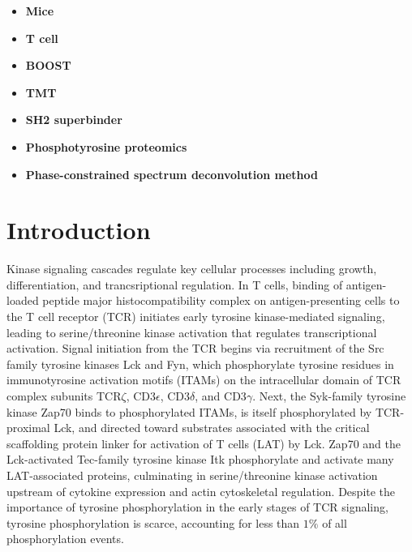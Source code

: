 \documentclass[journal=jprobs,manuscript=article]{achemso}
\begin{document}
\begin{itemize}
    \item {\textbf{Mice}}
    \item {\textbf{T cell}}
    \item {\textbf{BOOST} }
    \item {\textbf{TMT} }
    \item {\textbf{SH2 superbinder}}
    \item {\textbf{Phosphotyrosine proteomics} }
    \item {\textbf{Phase-constrained spectrum deconvolution method}}
\end{itemize}

\section{Introduction}


Kinase signaling cascades regulate key cellular processes including growth, differentiation, and trancsriptional regulation. In T cells, binding of antigen-loaded peptide major histocompatibility complex on antigen-presenting cells to the T cell  receptor (TCR) initiates early tyrosine kinase-mediated signaling, leading to serine/threonine kinase activation that regulates transcriptional activation\cite{gaud2018regulatory}. Signal initiation from the TCR begins via recruitment of the Src family tyrosine kinases Lck and Fyn, which phosphorylate tyrosine residues in immunotyrosine activation motifs (ITAMs) on the intracellular domain of TCR complex subunits TCR$\zeta$, CD3$\epsilon$, CD3$\delta$, and CD3$\gamma$\cite{palacios2004function,gaud2018regulatory}. Next, the Syk-family tyrosine kinase Zap70 binds to phosphorylated ITAMs, is itself phosphorylated by TCR-proximal Lck, and directed toward substrates associated with the critical scaffolding protein linker for activation of T cells (LAT) by Lck\cite{lo2018lck}. Zap70 and the Lck-activated Tec-family tyrosine kinase Itk phosphorylate and activate many LAT-associated proteins, culminating in serine/threonine kinase activation upstream of cytokine expression and actin cytoskeletal regulation\cite{gaud2018regulatory,kumari2014t}. Despite the importance of tyrosine phosphorylation in the early stages of TCR signaling, tyrosine phosphorylation is scarce, accounting for less than $1\%$ of all phosphorylation events\cite{hunter1980transforming,hunter2009tyrosine}.%
\end{document}
